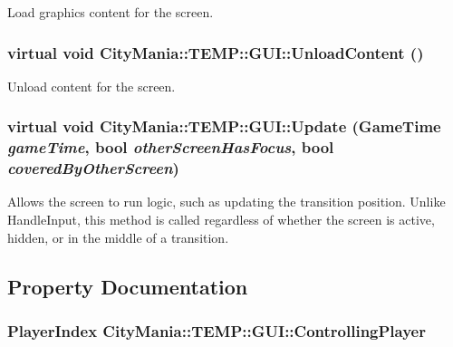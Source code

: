 Load graphics content for the screen. \hypertarget{classCityMania_1_1TEMP_1_1GUI_abc0a086362dacd228c79058353733fdf}{
\subsubsection[{UnloadContent}]{\setlength{\rightskip}{0pt plus 5cm}virtual void CityMania::TEMP::GUI::UnloadContent ()}}
\label{classCityMania_1_1TEMP_1_1GUI_abc0a086362dacd228c79058353733fdf}


Unload content for the screen. \hypertarget{classCityMania_1_1TEMP_1_1GUI_af8228ba5349b81662bb84b494f47a058}{
\subsubsection[{Update}]{\setlength{\rightskip}{0pt plus 5cm}virtual void CityMania::TEMP::GUI::Update (GameTime {\em gameTime}, \/  bool {\em otherScreenHasFocus}, \/  bool {\em coveredByOtherScreen})}}
\label{classCityMania_1_1TEMP_1_1GUI_af8228ba5349b81662bb84b494f47a058}


Allows the screen to run logic, such as updating the transition position. Unlike HandleInput, this method is called regardless of whether the screen is active, hidden, or in the middle of a transition. 

\subsection{Property Documentation}
\hypertarget{classCityMania_1_1TEMP_1_1GUI_aaa8bbe268b5e20cb09fd3703867e98b1}{
\subsubsection[{ControllingPlayer}]{\setlength{\rightskip}{0pt plus 5cm}PlayerIndex CityMania::TEMP::GUI::ControllingPlayer}}
\label{classCityMania_1_1TEMP_1_1GUI_aaa8bbe268b5e20cb09fd3703867e98b1}


